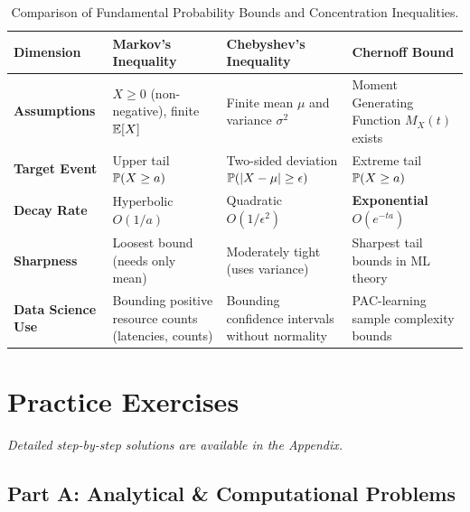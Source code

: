 \begin{table}[htbp]
\centering
\small
\begin{tabular}{p{3.2cm}p{3.8cm}p{3.8cm}p{3.5cm}}
\toprule
\textbf{Dimension} & \textbf{Markov's Inequality} & \textbf{Chebyshev's Inequality} & \textbf{Chernoff Bound} \\
\midrule
\textbf{Assumptions} & $X \ge 0$ (non-negative), finite $\E[X]$ & Finite mean $\mu$ and variance $\sigma^2$ & Moment Generating Function $M_X(t)$ exists \\
\addlinespace
\textbf{Target Event} & Upper tail $\P(X \ge a)$ & Two-sided deviation $\P(|X - \mu| \ge \epsilon)$ & Extreme tail $\P(X \ge a)$ \\
\addlinespace
\textbf{Decay Rate} & Hyperbolic $O(1/a)$ & Quadratic $O(1/\epsilon^2)$ & \textbf{Exponential} $O(e^{-t a})$ \\
\addlinespace
\textbf{Sharpness} & Loosest bound (needs only mean) & Moderately tight (uses variance) & Sharpest tail bounds in ML theory \\
\addlinespace
\textbf{Data Science Use} & Bounding positive resource counts (latencies, counts) & Bounding confidence intervals without normality & PAC-learning sample complexity bounds \\
\bottomrule
\end{tabular}
\caption{Comparison of Fundamental Probability Bounds and Concentration Inequalities.}
\end{table}

\newpage
\section{Practice Exercises}
\textit{Detailed step-by-step solutions are available in the Appendix.}

\subsection*{Part A: Analytical \& Computational Problems}

